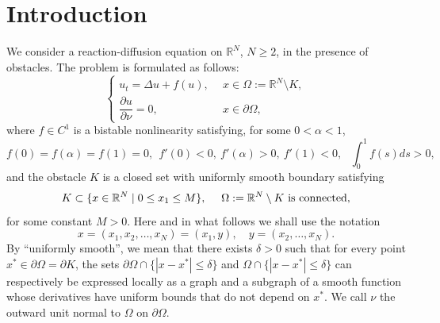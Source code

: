 \documentclass[a4paper,12pt,fullpage]{article}
\numberwithin{equation}{section}
\def\R{{\mathbb R}}
\begin{document}
\tableofcontents


\section{Introduction}\label{s:introduction}

We consider a reaction-diffusion equation on $\R^N$, $N\geq 2$, in the presence of obstacles. The problem is formulated as follows:
\begin{equation}\label{E}
\left\{
\begin{array}{ll}
u_t=\Delta u +f(u), \ \ &x\in \Omega:=\R^N\setminus K,\\[4pt]
\dfrac{\partial u}{\partial \nu} = 0, \ \ &x\in \partial\Omega,
\end{array}\right.
\end{equation}
where $f\in C^1$ is a bistable nonlinearity satisfying, for some $0<\alpha<1$,
\begin{equation}\label{f}
f(0)=f(\alpha)=f(1)=0, \ \ f'(0)<0,\ f'(\alpha)>0, \ f'(1)<0, \ \ \ \int_0^1 f(s)ds>0,
\end{equation}
and the obstacle $K$ is a closed set with uniformly smooth boundary satisfying
\begin{equation}\label{K}
K\subset\{x\in\R^N\mid 0\leq x_1\leq M\}, \quad\ \Omega:=\R^N\setminus K\ \hbox{is connected},
\end{equation}
for some constant $M>0$. Here and in what follows we shall use the notation
\[
x=(x_1,x_2,\ldots,x_N)=(x_1,y),\quad y=(x_2,\ldots,x_N).
\]
By ``uniformly smooth'', we mean that there exists $\delta>0$ such that for every point $x^*\in\partial\Omega=\partial K$, the sets $\partial\Omega\cap\{|x-x^*|\leq \delta\}$ and $\Omega\cap\{|x-x^*|\leq \delta\}$ can respectively be expressed locally as a graph and a subgraph of a smooth function whose derivatives have uniform bounds that do not depend on $x^*$. We call $\nu$ the outward unit normal to $\Omega$ on $\partial\Omega$.
\end{document}
